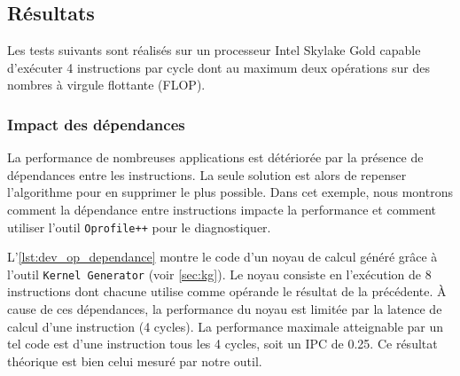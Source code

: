       
\subsection{Résultats}

    Les tests suivants sont réalisés sur un processeur Intel Skylake Gold capable d'exécuter 4 instructions par cycle dont au maximum deux opérations sur des nombres à virgule flottante (\gls{FLOP}).


    \subsubsection{Impact des dépendances}
        La performance de nombreuses applications est détériorée par la présence de dépendances entre les instructions. La seule solution est alors de repenser l'algorithme pour en supprimer le plus possible. Dans cet exemple, nous montrons comment la dépendance entre instructions impacte la performance et comment utiliser l'outil \verb=Oprofile++= pour le diagnostiquer. 
        
        L'\autoref{lst:dev_op_dependance} montre le code d'un noyau de calcul généré grâce à l'outil \verb|Kernel Generator| (voir \autoref{sec:kg}). Le noyau consiste en l'exécution de 8 instructions dont chacune utilise comme opérande le résultat de la précédente. À cause de ces dépendances, la performance du noyau est limitée par la latence de calcul d'une instruction (4 cycles). La performance maximale atteignable par un tel code est d’une instruction tous les 4 cycles, soit un IPC de 0.25. Ce résultat théorique est bien celui mesuré par notre outil. 
        
